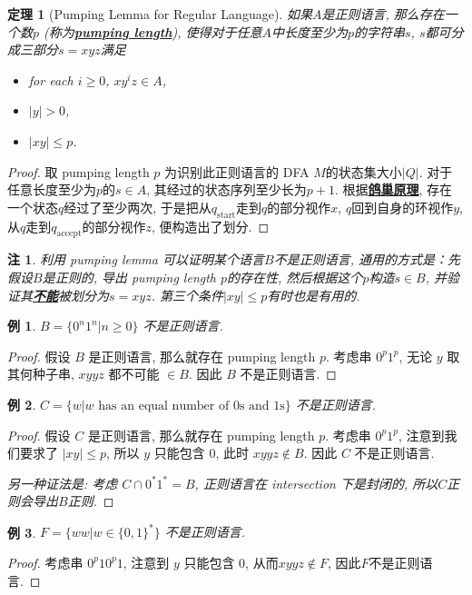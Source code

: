 \documentclass[8pt]{article}
\theoremstyle{compact}
\newtheorem{theorem}{定理}[section]
\newtheorem{example}{例}[section]
\newtheorem{remark}{注}[section]
\def\obj#1{\textbf{\uline{#1}}}
\def\le{\leqslant}
\def\ge{\geqslant}
\begin{document}
\begin{theorem}[Pumping Lemma for Regular Language]
	如果$A$是正则语言, 那么存在一个数$p$ (称为\obj{pumping length}), 使得对于任意$A$中长度至少为$p$的字符串$s$, $s$都可分成三部分$s = xyz$满足
	\begin{itemize}
		\item for each $i \ge 0$, $xy^iz \in A$,
		\item $|y| > 0$,
		\item $|xy| \le p$.
	\end{itemize}
\end{theorem}
\begin{proof}
	取 pumping length $p$ 为识别此正则语言的 DFA $M$的状态集大小$|Q|$. 对于任意长度至少为$p$的$s \in A$, 其经过的状态序列至少长为$p+1$. 根据\obj{鸽巢原理}, 存在一个状态$q$经过了至少两次, 于是把从$q_{\text{start}}$走到$q$的部分视作$x$, $q$回到自身的环视作$y$, 从$q$走到$q_{\text{accept}}$的部分视作$z$, 便构造出了划分. 
\end{proof}
\begin{remark}
	利用 pumping lemma 可以证明某个语言$B$不是正则语言, 通用的方式是：先假设$B$是正则的, 导出 pumping length $p$的存在性, 然后根据这个$p$构造$s \in B$, 并验证其\obj{不能}被划分为$s = xyz$. 第三个条件$|xy| \le p$有时也是有用的. 
\end{remark}
\begin{example}
	$B = \{0^n1^n | n \ge 0\}$ 不是正则语言.
\end{example}
\begin{proof}
	假设 $B$ 是正则语言, 那么就存在 pumping length $p$. 考虑串 $0^p1^p$, 无论 $y$ 取其何种子串, $xyyz$ 都不可能 $\in B$. 因此 $B$ 不是正则语言.
\end{proof}
\begin{example}
	$C = \{w | w \text{ has an equal number of 0s and 1s}\}$ 不是正则语言.
\end{example}
\begin{proof}
	假设 $C$ 是正则语言, 那么就存在 pumping length $p$. 考虑串 $0^p1^p$, 注意到我们要求了 $|xy| \le p$, 所以 $y$ 只能包含 $0$, 此时 $xyyz \notin B$. 因此 $C$ 不是正则语言.
	
	\textit{另一种证法是: 考虑 $C \cap 0^*1^* = B$, 正则语言在 intersection 下是封闭的, 所以$C$正则会导出$B$正则.}
\end{proof}
\begin{example}
	$F = \{ww | w \in \{0, 1\}^*\}$ 不是正则语言.
\end{example}
\begin{proof}
	考虑串 $0^p10^p1$, 注意到 $y$ 只能包含 $0$, 从而$xyyz \notin F$, 因此$F$不是正则语言.
\end{proof}
\end{document}
